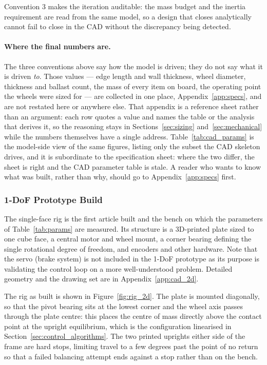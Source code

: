 Convention 3 makes the iteration auditable: the mass budget and the inertia
requirement are read from the same model, so a design that closes analytically
cannot fail to close in the CAD without the discrepancy being detected.

\paragraph{Where the final numbers are.} The three conventions above say how
the model is driven; they do not say what it is driven \emph{to}. Those values
--- edge length and wall thickness, wheel diameter, thickness and ballast
count, the mass of every item on board, the operating point the wheels were
sized for --- are collected in one place, Appendix~\ref{app:specs}, and are
not restated here or anywhere else. That appendix is a reference sheet rather
than an argument: each row quotes a value and names the table or the analysis
that derives it, so the reasoning stays in Sections~\ref{sec:sizing}
and~\ref{sec:mechanical} while the numbers themselves have a single address.
Table~\ref{tab:cad_params} is the model-side view of the same figures, listing
only the subset the CAD skeleton drives, and it is subordinate to the
specification sheet: where the two differ, the sheet is right and the CAD
parameter table is stale. A reader who wants to know what was built, rather
than why, should go to Appendix~\ref{app:specs} first.

\subsubsection{1-DoF Prototype Build}
\label{sec:cad_2d}

The single-face rig is the first article built and the bench on which the
parameters of Table~\ref{tab:params} are measured. Its structure is a
3D-printed plate sized to one cube face, a central motor and wheel mount, a
corner bearing defining the single rotational degree of freedom, and encoders and other hardware. Note that the servo (brake system) is not included in the 1-DoF prototype as its purpose is validating the control loop on a more well-understood problem. Detailed geometry and the drawing set are in Appendix~\ref{app:cad_2d}.

The rig as built is shown in Figure~\ref{fig:rig_2d}. The plate is mounted
diagonally, so that the pivot bearing sits at the lowest corner and the wheel
axis passes through the plate centre: this places the centre of mass directly
above the contact point at the upright equilibrium, which is the configuration
linearised in Section~\ref{sec:control_algorithms}. The two printed uprights either side
of the frame are hard stops, limiting travel to a few degrees past the point of
no return so that a failed balancing attempt ends against a stop rather than on
the bench.

